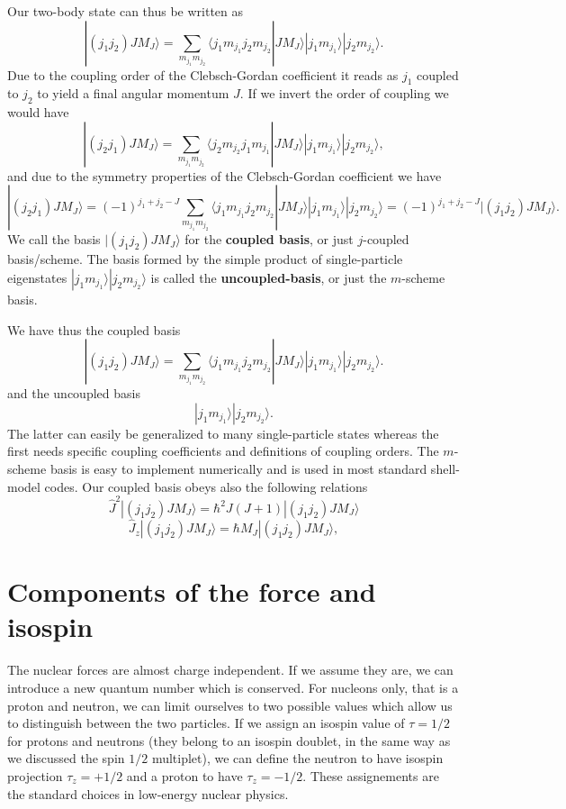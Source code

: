 \documentclass[graybox,sectrefs,envcountresetchap,open=right]{svmonodo}
\begin{document}
Our two-body state can thus be written as 
\[
|(j_1j_2)JM_J\rangle=\sum_{m_{j_1}m_{j_2}}\langle j_1m_{j_1}j_2m_{j_2}|JM_J\rangle|j_1m_{j_1}\rangle|j_2m_{j_2}\rangle.
\]
Due to the coupling order of the Clebsch-Gordan coefficient it reads as 
$j_1$ coupled to $j_2$ to yield a final angular momentum $J$. If we invert the order of coupling we would have
\[
|(j_2j_1)JM_J\rangle=\sum_{m_{j_1}m_{j_2}}\langle j_2m_{j_2}j_1m_{j_1}|JM_J\rangle|j_1m_{j_1}\rangle|j_2m_{j_2}\rangle,
\]
and due to the symmetry properties of the Clebsch-Gordan coefficient we have
\[
|(j_2j_1)JM_J\rangle=(-1)^{j_1+j_2-J}\sum_{m_{j_1}m_{j_2}}\langle j_1m_{j_1}j_2m_{j_2}|JM_J\rangle|j_1m_{j_1}\rangle|j_2m_{j_2}\rangle=(-1)^{j_1+j_2-J}|(j_1j_2)JM_J\rangle.
\]
We call the basis $|(j_1j_2)JM_J\rangle$ for the \textbf{coupled basis}, or just $j$-coupled basis/scheme. The basis formed by the simple product of single-particle eigenstates 
$|j_1m_{j_1}\rangle|j_2m_{j_2}\rangle$ is called the \textbf{uncoupled-basis}, or just the $m$-scheme basis. 



We have thus the coupled basis 
\[
|(j_1j_2)JM_J\rangle=\sum_{m_{j_1}m_{j_2}}\langle j_1m_{j_1}j_2m_{j_2}|JM_J\rangle|j_1m_{j_1}\rangle|j_2m_{j_2}\rangle.
\]
and the uncoupled basis 
\[
|j_1m_{j_1}\rangle|j_2m_{j_2}\rangle.
\]
The latter can easily be generalized to many single-particle states whereas the first 
needs specific coupling coefficients and definitions of coupling orders. 
The $m$-scheme basis is easy to implement numerically and is used in most standard shell-model codes. 
Our coupled basis obeys also the following relations
\[
   \hat{J}^2|(j_1j_2)JM_J\rangle=\hbar^2J(J+1)|(j_1j_2)JM_J\rangle
\]
\[
   \hat{J}_z|(j_1j_2)JM_J\rangle=\hbar M_J|(j_1j_2)JM_J\rangle,
\]




\section{Components of the force and isospin}

 The nuclear forces are almost charge independent. If we assume they are, 
we can introduce a new quantum number which is conserved. For nucleons only, that is a proton and neutron, we can limit ourselves
to two possible values which allow us to distinguish between the two particles. If we assign an isospin value of $\tau=1/2$ for protons
and neutrons (they belong to an isospin doublet, in the same way as we discussed the spin $1/2$ multiplet), we can define 
the neutron to have isospin projection $\tau_z=+1/2$ and a proton to have $\tau_z=-1/2$. These assignements are the standard choices in low-energy nuclear physics.
\end{document}

